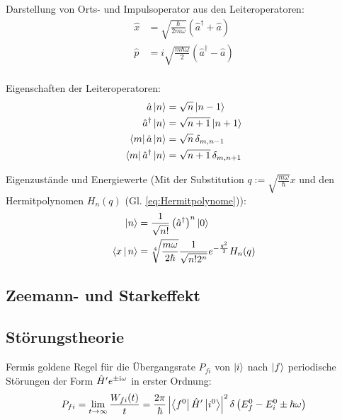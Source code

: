 \documentclass[11pt]{article}
\numberwithin{equation}{section}
\begin{document}
				\noindent
				Darstellung von Orts- und Impulsoperator aus den Leiteroperatoren:
				\begin{equation}
					\begin{aligned}
						\hat{x} &= \sqrt{\frac{\hbar}{2m\omega}}\left(\hat{a}^\dagger + \hat{a} \right) \\
						\hat{p} &= i\sqrt{\frac{m\hbar\omega}{2}}\left(\hat{a}^\dagger - \hat{a} \right) \\
					\end{aligned}
				\end{equation}

				\noindent
				Eigenschaften der Leiteroperatoren:
				\begin{equation}
					\begin{aligned}
						\hat{a}\Ket{n} &= \sqrt{n}\Ket{n-1} \\
						\hat{a}^\dagger\Ket{n} &= \sqrt{n+1}\Ket{n+1} \\
						\Bra{m}\hat{a}\Ket{n} &= \sqrt{n} \,\delta_{m,n-1} \\
						\Bra{m}\hat{a}^\dagger\Ket{n} &= \sqrt{n+1} \,\delta_{m,n+1} \\
					\end{aligned}
				\end{equation}

				\noindent
				Eigenzustände und Energiewerte (Mit der Substitution $q:=\sqrt{\frac{m\omega}{\hbar}}x$ und den Hermitpolynomen $H_n(q)$ (Gl. \ref{eq:Hermitpolynome})):
				\begin{equation}
					\begin{aligned}
						\Ket{n} &= \frac{1}{\sqrt{n!}}\left(\hat{a}^\dagger\right)^n\Ket{0} \\
						\Braket{x|n} &= \sqrt[4]{\frac{m\omega}{2\hbar}} \frac{1}{\sqrt{n! 2^n}} e^{-\frac{q^2}{2}} H_n(q) \\
					\end{aligned}
				\end{equation}

		\subsection{Zeemann- und Starkeffekt}
			


		\subsection{Störungstheorie}
			\noindent
			Fermis goldene Regel für die Übergangsrate $P_{fi}$ von $\Ket{i}$ nach $\Ket{f}$ periodische Störungen der Form $\hat{H}' e^{\pm\mathrm{i}\omega}$ in erster Ordnung:
			\begin{equation}
				P_{fi} = \lim_{t\rightarrow\infty} \frac{W_{fi}(t)}{t} = \frac{2\pi}{\hbar} \left| \Bra{f^0}\hat{H}'\Ket{i^0} \right|^2 \delta\left( E_f^0 - E_i^0 \pm \hbar\omega \right)
			\end{equation}
\end{document}
